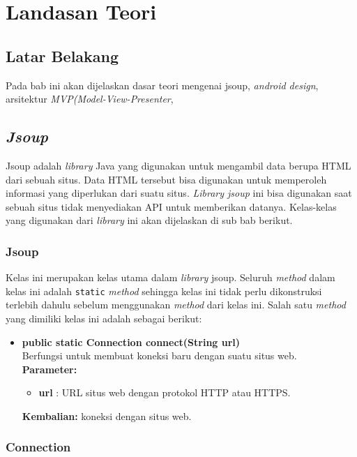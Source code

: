 \chapter{Landasan Teori}
\label{chap:teori}

\section{Latar Belakang}
\label{sec:latar} 
Pada bab ini akan dijelaskan dasar teori mengenai jsoup, \textit{android design}, arsitektur \textit{MVP(Model-View-Presenter},  

\section{\textit{Jsoup}}
\label{sec:jsoup}
Jsoup adalah \textit{library} Java yang digunakan untuk mengambil data berupa HTML dari sebuah situs. Data HTML tersebut bisa digunakan untuk memperoleh informasi yang diperlukan dari suatu situs\cite{jsoup}. \textit{Library jsoup} ini bisa digunakan saat sebuah situs tidak menyediakan API untuk memberikan datanya. Kelas-kelas yang digunakan dari \textit{library} ini akan dijelaskan di sub bab berikut.

\subsection{Jsoup}

Kelas ini merupakan kelas utama dalam \textit{library} jsoup. Seluruh \textit{method} dalam kelas ini adalah \texttt{static} \textit{method} sehingga kelas ini tidak perlu dikonstruksi terlebih dahulu sebelum menggunakan \textit{method} dari kelas ini. Salah satu \textit{method} yang dimiliki kelas ini adalah sebagai berikut:
\begin{itemize}
	\item \textbf{public static Connection connect(String url)} \\
		Berfungsi untuk membuat koneksi baru dengan suatu situs web. \\
		\textbf{Parameter:}
		\begin{itemize}
			\item \textbf{url} : URL situs web dengan protokol HTTP atau HTTPS.
		\end{itemize}
		\textbf{Kembalian:} koneksi dengan situs web.
\end{itemize}

\subsection{Connection}

